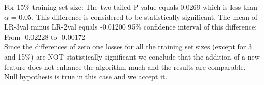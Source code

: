\documentclass[12pt]{article}
\begin{document}
For 15\% training set size:
  The two-tailed P value equals 0.0269  which is less than $\alpha$ = 0.05.
  This difference is considered to be statistically significant. 
  The mean of  LR-3val minus LR-2val  equals -0.01200
  95\% confidence interval of this difference: From -0.02228 to -0.00172   \\

Since the differences of zero one losses for all the training set sizes (except for 3 and 15\%)
are NOT statistically significant we conclude that the addition of a new feature
does not enhance the algorithm much and the results are comparable. Null hypothesis
is true in this case and we accept it.
\end{document}
